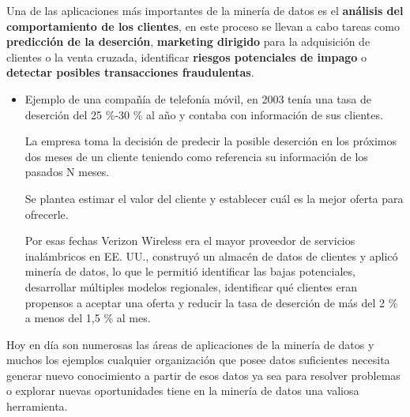 \documentclass[12pt, twoside, openright]{report} %
\begin{document}
Una de las aplicaciones más importantes de la minería de datos es el \textbf{análisis del comportamiento de los clientes}, en este proceso se llevan a cabo tareas como \textbf{predicción de la deserción}, \textbf{marketing dirigido} para la adquisición de clientes o la venta cruzada, identificar \textbf{riesgos potenciales de impago} o \textbf{detectar posibles transacciones fraudulentas}.
\begin{itemize}
	\item Ejemplo de una compañía de telefonía móvil, en 2003 tenía una tasa de deserción del 25 \%-30 \% al año y contaba con información de sus clientes.

	      La empresa toma la decisión de predecir la posible deserción en los próximos dos meses de un cliente teniendo como referencia su información de los pasados N meses.

	      Se plantea estimar el valor del cliente y establecer cuál es la mejor oferta para ofrecerle.

	      Por esas fechas Verizon Wireless era el mayor proveedor de servicios inalámbricos en EE. UU., construyó un almacén de datos de clientes y aplicó minería de datos, lo que le permitió identificar las bajas potenciales, desarrollar múltiples modelos regionales, identificar qué clientes eran propensos a aceptar una oferta y reducir la tasa de deserción de más del 2 \% a menos del 1,5 \% al mes.
\end{itemize}

Hoy en día son numerosas las áreas de aplicaciones de la minería de datos y muchos los ejemplos cualquier organización que posee datos suficientes necesita generar nuevo conocimiento a partir de esos datos ya sea para resolver problemas o explorar nuevas oportunidades tiene en la minería de datos una valiosa herramienta.
\end{document}
